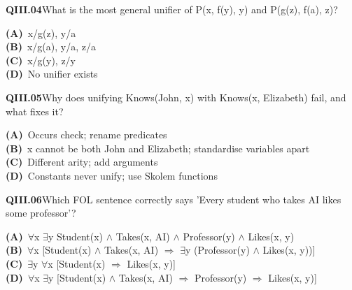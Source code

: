 \begin{tcolorbox}[enhanced,breakable,colback=white,colframe=navyL,arc=2mm,boxrule=0.7pt,left=3mm,right=3mm,top=2mm,bottom=2mm]
\textbf{\color{navy}QIII.04}\quad What is the most general unifier of P(x, f(y), y) and P(g(z), f(a), z)?\hfill{}\par\smallskip
{\small \textbf{\color{navyL}(A)}\ {x/g(z), y/a}\\[1pt]\textbf{\color{navyL}(B)}\ {x/g(a), y/a, z/a}\\[1pt]\textbf{\color{navyL}(C)}\ {x/g(y), z/y}\\[1pt]\textbf{\color{navyL}(D)}\ No unifier exists}
\end{tcolorbox}
\begin{tcolorbox}[enhanced,breakable,colback=white,colframe=navyL,arc=2mm,boxrule=0.7pt,left=3mm,right=3mm,top=2mm,bottom=2mm]
\textbf{\color{navy}QIII.05}\quad Why does unifying Knows(John, x) with Knows(x, Elizabeth) fail, and what fixes it?\hfill{}\par\smallskip
{\small \textbf{\color{navyL}(A)}\ Occurs check; rename predicates\\[1pt]\textbf{\color{navyL}(B)}\ x cannot be both John and Elizabeth; standardise variables apart\\[1pt]\textbf{\color{navyL}(C)}\ Different arity; add arguments\\[1pt]\textbf{\color{navyL}(D)}\ Constants never unify; use Skolem functions}
\end{tcolorbox}
\begin{tcolorbox}[enhanced,breakable,colback=white,colframe=navyL,arc=2mm,boxrule=0.7pt,left=3mm,right=3mm,top=2mm,bottom=2mm]
\textbf{\color{navy}QIII.06}\quad Which FOL sentence correctly says 'Every student who takes AI likes some professor'?\hfill{}\par\smallskip
{\small \textbf{\color{navyL}(A)}\ $\forall$x $\exists$y Student(x) $\wedge$ Takes(x, AI) $\wedge$ Professor(y) $\wedge$ Likes(x, y)\\[1pt]\textbf{\color{navyL}(B)}\ $\forall$x [Student(x) $\wedge$ Takes(x, AI) $\Rightarrow$ $\exists$y (Professor(y) $\wedge$ Likes(x, y))]\\[1pt]\textbf{\color{navyL}(C)}\ $\exists$y $\forall$x [Student(x) $\Rightarrow$ Likes(x, y)]\\[1pt]\textbf{\color{navyL}(D)}\ $\forall$x $\exists$y [Student(x) $\wedge$ Takes(x, AI) $\Rightarrow$ Professor(y) $\Rightarrow$ Likes(x, y)]}
\end{tcolorbox}
